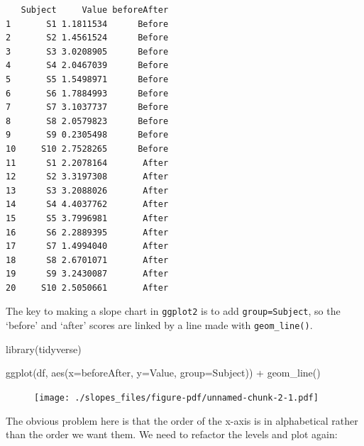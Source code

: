 \documentclass[
  letterpaper,
  DIV=11,
  numbers=noendperiod]{scrreprt}
\newenvironment{Shaded}{\begin{snugshade}}{\end{snugshade}}
\newcommand{\AttributeTok}[1]{\textcolor[rgb]{0.40,0.45,0.13}{#1}}
\newcommand{\FunctionTok}[1]{\textcolor[rgb]{0.28,0.35,0.67}{#1}}
\newcommand{\NormalTok}[1]{\textcolor[rgb]{0.00,0.23,0.31}{#1}}
\newcommand{\OtherTok}[1]{\textcolor[rgb]{0.00,0.23,0.31}{#1}}
\newcommand{\SpecialCharTok}[1]{\textcolor[rgb]{0.37,0.37,0.37}{#1}}
\newcommand{\StringTok}[1]{\textcolor[rgb]{0.13,0.47,0.30}{#1}}
\begin{document}
\begin{verbatim}
   Subject     Value beforeAfter
1       S1 1.1811534      Before
2       S2 1.4561524      Before
3       S3 3.0208905      Before
4       S4 2.0467039      Before
5       S5 1.5498971      Before
6       S6 1.7884993      Before
7       S7 3.1037737      Before
8       S8 2.0579823      Before
9       S9 0.2305498      Before
10     S10 2.7528265      Before
11      S1 2.2078164       After
12      S2 3.3197308       After
13      S3 3.2088026       After
14      S4 4.4037762       After
15      S5 3.7996981       After
16      S6 2.2889395       After
17      S7 1.4994040       After
18      S8 2.6701071       After
19      S9 3.2430087       After
20     S10 2.5050661       After
\end{verbatim}

The key to making a slope chart in \texttt{ggplot2} is to add
\texttt{group=Subject}, so the `before' and `after' scores are linked by
a line made with \texttt{geom\_line()}.

\begin{Shaded}
\begin{Highlighting}[]
\FunctionTok{library}\NormalTok{(tidyverse)}

\FunctionTok{ggplot}\NormalTok{(df, }\FunctionTok{aes}\NormalTok{(}\AttributeTok{x=}\NormalTok{beforeAfter, }\AttributeTok{y=}\NormalTok{Value, }\AttributeTok{group=}\NormalTok{Subject)) }\SpecialCharTok{+}
  \FunctionTok{geom\_line}\NormalTok{()}
\end{Highlighting}
\end{Shaded}

\begin{figure}[H]

{\centering \texttt{[image: ./slopes\_files/figure-pdf/unnamed-chunk-2-1.pdf]}

}

\end{figure}

The obvious problem here is that the order of the x-axis is in
alphabetical rather than the order we want them. We need to refactor the
levels and plot again:

\begin{Shaded}
\end{Shaded}
\end{document}
